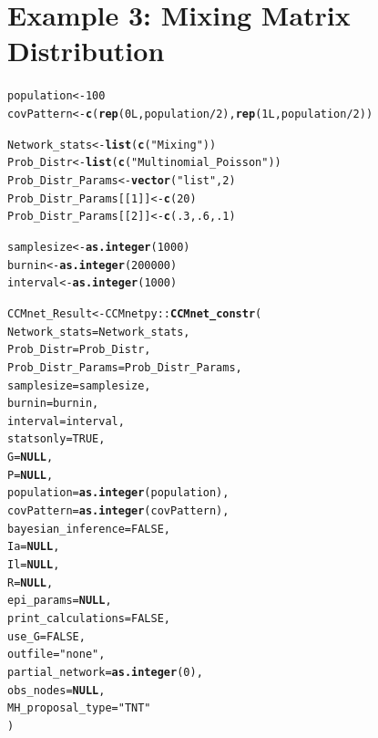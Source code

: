 \documentclass{article}\usepackage[]{graphicx}\usepackage[]{xcolor}
\makeatletter
\newcommand{\hlnum}[1]{\textcolor[rgb]{0.686,0.059,0.569}{#1}}%
\newcommand{\hlsng}[1]{\textcolor[rgb]{0.192,0.494,0.8}{#1}}%
\newcommand{\hlopt}[1]{\textcolor[rgb]{0,0,0}{#1}}%
\newcommand{\hldef}[1]{\textcolor[rgb]{0.345,0.345,0.345}{#1}}%
\newcommand{\hlkwa}[1]{\textcolor[rgb]{0.161,0.373,0.58}{\textbf{#1}}}%
\newcommand{\hlkwb}[1]{\textcolor[rgb]{0.69,0.353,0.396}{#1}}%
\newcommand{\hlkwc}[1]{\textcolor[rgb]{0.333,0.667,0.333}{#1}}%
\newcommand{\hlkwd}[1]{\textcolor[rgb]{0.737,0.353,0.396}{\textbf{#1}}}%
\newenvironment{kframe}{%
 \def\at@end@of@kframe{}%
 \ifinner\ifhmode%
  \def\at@end@of@kframe{\end{minipage}}%
  \begin{minipage}{\columnwidth}%
 \fi\fi%
 \def\FrameCommand##1{\hskip\@totalleftmargin \hskip-\fboxsep
 \colorbox{shadecolor}{##1}\hskip-\fboxsep
     \hskip-\linewidth \hskip-\@totalleftmargin \hskip\columnwidth}%
 \MakeFramed {\advance\hsize-\width
   \@totalleftmargin\z@ \linewidth\hsize
   \@setminipage}}%
 {\par\unskip\endMakeFramed%
 \at@end@of@kframe}
\makeatother
\begin{document}
\section{Example 3: Mixing Matrix Distribution}

\begin{kframe}
\begin{alltt}
\hldef{population} \hlkwb{<-} \hlnum{100}
\hldef{covPattern} \hlkwb{<-} \hlkwd{c}\hldef{(}\hlkwd{rep}\hldef{(}\hlnum{0L}\hldef{, population}\hlopt{/}\hlnum{2}\hldef{),} \hlkwd{rep}\hldef{(}\hlnum{1L}\hldef{, population}\hlopt{/}\hlnum{2}\hldef{))}

\hldef{Network_stats} \hlkwb{<-} \hlkwd{list}\hldef{(}\hlkwd{c}\hldef{(}\hlsng{"Mixing"}\hldef{))}
\hldef{Prob_Distr} \hlkwb{<-} \hlkwd{list}\hldef{(}\hlkwd{c}\hldef{(}\hlsng{"Multinomial_Poisson"}\hldef{))}
\hldef{Prob_Distr_Params} \hlkwb{<-} \hlkwd{vector}\hldef{(}\hlsng{"list"}\hldef{,} \hlnum{2}\hldef{)}
\hldef{Prob_Distr_Params[[}\hlnum{1}\hldef{]]} \hlkwb{<-} \hlkwd{c}\hldef{(}\hlnum{20}\hldef{)}
\hldef{Prob_Distr_Params[[}\hlnum{2}\hldef{]]} \hlkwb{<-} \hlkwd{c}\hldef{(}\hlnum{.3}\hldef{,} \hlnum{.6}\hldef{,} \hlnum{.1}\hldef{)}

\hldef{samplesize} \hlkwb{<-} \hlkwd{as.integer}\hldef{(}\hlnum{1000}\hldef{)}
\hldef{burnin} \hlkwb{<-} \hlkwd{as.integer}\hldef{(}\hlnum{200000}\hldef{)}
\hldef{interval} \hlkwb{<-} \hlkwd{as.integer}\hldef{(}\hlnum{1000}\hldef{)}

\hldef{CCMnet_Result} \hlkwb{<-} \hldef{CCMnetpy}\hlopt{::}\hlkwd{CCMnet_constr}\hldef{(}
  \hlkwc{Network_stats}\hldef{=Network_stats,}
  \hlkwc{Prob_Distr}\hldef{=Prob_Distr,}
  \hlkwc{Prob_Distr_Params}\hldef{=Prob_Distr_Params,}
  \hlkwc{samplesize} \hldef{= samplesize,}
  \hlkwc{burnin}\hldef{=burnin,}
  \hlkwc{interval}\hldef{=interval,}
  \hlkwc{statsonly}\hldef{=}\hlnum{TRUE}\hldef{,}
  \hlkwc{G}\hldef{=}\hlkwa{NULL}\hldef{,}
  \hlkwc{P}\hldef{=}\hlkwa{NULL}\hldef{,}
  \hlkwc{population}\hldef{=}\hlkwd{as.integer}\hldef{(population),}
  \hlkwc{covPattern} \hldef{=} \hlkwd{as.integer}\hldef{(covPattern),}
  \hlkwc{bayesian_inference} \hldef{=} \hlnum{FALSE}\hldef{,}
  \hlkwc{Ia} \hldef{=} \hlkwa{NULL}\hldef{,}
  \hlkwc{Il} \hldef{=} \hlkwa{NULL}\hldef{,}
  \hlkwc{R} \hldef{=} \hlkwa{NULL}\hldef{,}
  \hlkwc{epi_params} \hldef{=} \hlkwa{NULL}\hldef{,}
  \hlkwc{print_calculations} \hldef{=} \hlnum{FALSE}\hldef{,}
  \hlkwc{use_G} \hldef{=} \hlnum{FALSE}\hldef{,}
  \hlkwc{outfile} \hldef{=} \hlsng{"none"}\hldef{,}
  \hlkwc{partial_network} \hldef{=} \hlkwd{as.integer}\hldef{(}\hlnum{0}\hldef{),}
  \hlkwc{obs_nodes} \hldef{=} \hlkwa{NULL}\hldef{,}
  \hlkwc{MH_proposal_type} \hldef{=} \hlsng{"TNT"}
\hldef{)}


\end{alltt}
\end{kframe}
\end{document}
